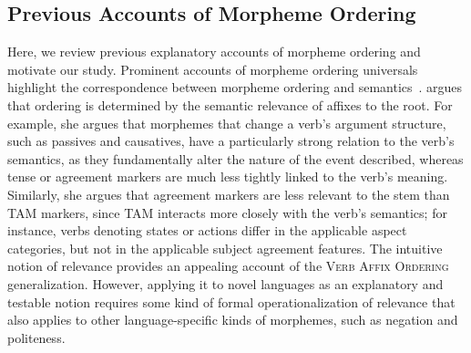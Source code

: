 \documentclass[man]{apa7}
\newcommand{\citep}{\parencite}
\newcommand{\citet}{\Textcite}
\begin{document}
\subsection{Previous Accounts of Morpheme Ordering}\label{sec:previous}

Here, we review previous explanatory accounts of morpheme ordering and motivate our study.
Prominent accounts of morpheme ordering universals highlight the correspondence between morpheme ordering and semantics~\citep{bybee-morphology-1985,rice2000morpheme}.
\citet{bybee-morphology-1985} argues that ordering is determined by the semantic relevance of affixes to the root.
For example, she argues that morphemes that change a verb's argument structure, such as passives and causatives, have a particularly strong relation to the verb's semantics, as they fundamentally alter the nature of the event described, whereas tense or agreement markers are much less tightly linked to the verb's meaning.
Similarly, she argues that agreement markers are less relevant to the stem than TAM markers, since TAM interacts more closely with the verb's semantics; for instance, verbs denoting states or actions differ in the applicable aspect categories, but not in the applicable subject agreement features.
The intuitive notion of relevance provides an appealing account of the \textsc{Verb Affix Ordering} generalization.
However, applying it to novel languages as an explanatory and testable notion requires some kind of formal operationalization of relevance that also applies to other language-specific kinds of morphemes, such as negation and politeness.
\end{document}
